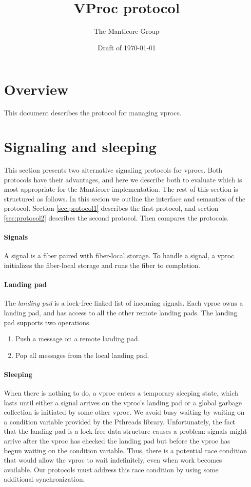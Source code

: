 \documentclass[11pt]{article}
\title{VProc protocol}
\author{The Manticore Group}
\date{Draft of \today}
\begin{document}
\maketitle

\section{Overview}
This document describes the protocol for managing vprocs.

\section{Signaling and sleeping}\label{sec:signaling-and-sleeping}
This section presents two alternative signaling protocols for vprocs.
Both protocols have their advantages, and here we describe both to evaluate
which is most appropriate for the Manticore implementation.
The rest of this section is structured as follows.
In this secion we outline the interface and semantics of the protocol.
Section \ref{sec:protocol1} describes the first protocol, and section
\ref{sec:protocol2} describes the second protocol.
Then  compares the protocols.

\paragraph{Signals}
A signal is a fiber paired with fiber-local storage.
To handle a signal, a vproc initializes the fiber-local storage and runs the fiber to completion.

\paragraph{Landing pad}
The \emph{landing pad} is a lock-free linked list of incoming signals.
Each vproc owns a landing pad, and has access to all the other remote landing pads.
The landing pad supports two operations.
\begin{enumerate}
  \item Push a message on a remote landing pad.
  \item Pop all messages from the local landing pad.
\end{enumerate}

\paragraph{Sleeping}
When there is nothing to do, a vproc enters a temporary sleeping state, which lasts until either a
signal arrives on the vproc's landing pad or a global garbage collection is initiated by some other
vproc.
We avoid busy waiting by waiting on a condition variable provided by the Pthreads
library.
Unfortunately, the fact that the landing pad is a lock-free data structure causes
a problem:
signals might arrive after the vproc has checked the landing pad but before the vproc has
begun waiting on the condition variable.
Thus, there is a potential race condition that would allow the vproc to wait indefinitely,
even when work becomes available.
Our protocols must address this race condition by using some additional
synchronization.
\end{document}
